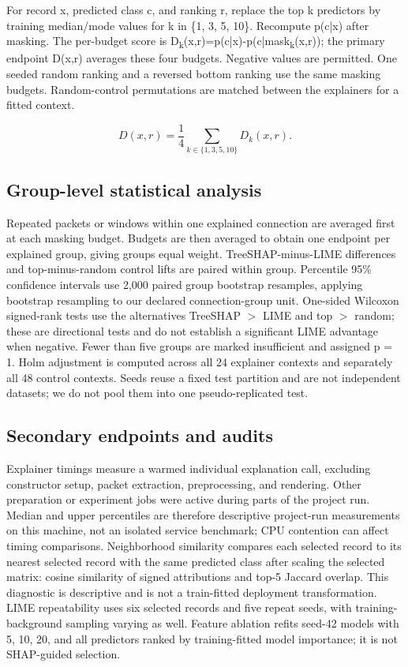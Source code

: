 \documentclass[conference,letterpaper]{IEEEtran}
\begin{document}
For record x, predicted class c, and ranking r, replace the top k predictors by training median/mode values for k in \{1, 3, 5, 10\}. Recompute p(c|x) after masking. The per-budget score is D\textsubscript{k}(x,r)=p(c|x)-p(c|mask\textsubscript{k}(x,r)); the primary endpoint D(x,r) averages these four budgets. Negative values are permitted. One seeded random ranking and a reversed bottom ranking use the same masking budgets. Random-control permutations are matched between the explainers for a fitted context.

\begin{equation} D(x,r)=\frac{1}{4}\sum_{k\in\{1,3,5,10\}} D_k(x,r).\label{eq:deletion}\end{equation}
\subsection{Group-level statistical analysis}
Repeated packets or windows within one explained connection are averaged first at each masking budget. Budgets are then averaged to obtain one endpoint per explained group, giving groups equal weight. TreeSHAP-minus-LIME differences and top-minus-random control lifts are paired within group. Percentile 95\% confidence intervals use 2,000 paired group bootstrap resamples, applying bootstrap resampling \cite{ref34} to our declared connection-group unit. One-sided Wilcoxon signed-rank tests \cite{ref35} use the alternatives TreeSHAP \ensuremath{>} LIME and top \ensuremath{>} random; these are directional tests and do not establish a significant LIME advantage when negative. Fewer than five groups are marked insufficient and assigned p = 1. Holm adjustment \cite{ref36} is computed across all 24 explainer contexts and separately all 48 control contexts. Seeds reuse a fixed test partition and are not independent datasets; we do not pool them into one pseudo-replicated test.

\subsection{Secondary endpoints and audits}
Explainer timings measure a warmed individual explanation call, excluding constructor setup, packet extraction, preprocessing, and rendering. Other preparation or experiment jobs were active during parts of the project run. Median and upper percentiles are therefore descriptive project-run measurements on this machine, not an isolated service benchmark; CPU contention can affect timing comparisons. Neighborhood similarity compares each selected record to its nearest selected record with the same predicted class after scaling the selected matrix: cosine similarity of signed attributions and top-5 Jaccard overlap. This diagnostic is descriptive and is not a train-fitted deployment transformation. LIME repeatability uses six selected records and five repeat seeds, with training-background sampling varying as well. Feature ablation refits seed-42 models with 5, 10, 20, and all predictors ranked by training-fitted model importance; it is not SHAP-guided selection.
\end{document}
